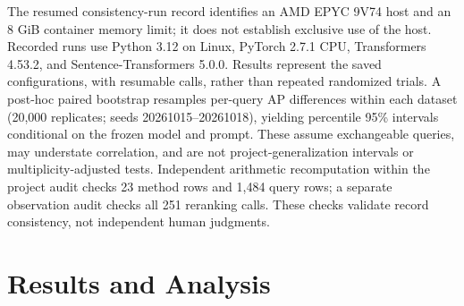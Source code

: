 \documentclass[conference,letterpaper,10pt]{IEEEtran}
\begin{document}
The resumed consistency-run record identifies an AMD EPYC 9V74 host and an 8 GiB container memory limit; it does not establish exclusive use of the host. Recorded runs use Python 3.12 on Linux, PyTorch 2.7.1 CPU, Transformers 4.53.2, and Sentence-Transformers 5.0.0. Results represent the saved configurations, with resumable calls, rather than repeated randomized trials. A post-hoc paired bootstrap resamples per-query AP differences within each dataset (20,000 replicates; seeds 20261015--20261018), yielding percentile 95\% intervals conditional on the frozen model and prompt. These assume exchangeable queries, may understate correlation, and are not project-generalization intervals or multiplicity-adjusted tests. Independent arithmetic recomputation within the project audit checks 23 method rows and 1,484 query rows; a separate observation audit checks all 251 reranking calls. These checks validate record consistency, not independent human judgments.

\section{Results and Analysis}
\end{document}
